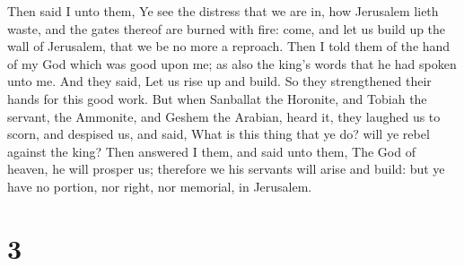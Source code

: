  Then said I unto them, Ye see the distress that we are
in, how Jerusalem lieth waste, and the gates thereof are burned with
fire: come, and let us build up the wall of Jerusalem, that we be no
more a reproach.  Then I told them of the hand of my God
which was good upon me; as also the king's words that he had spoken unto
me. And they said, Let us rise up and build. So they strengthened their
hands for this good work.  But when Sanballat the Horonite,
and Tobiah the servant, the Ammonite, and Geshem the Arabian, heard it,
they laughed us to scorn, and despised us, and said, What is this thing
that ye do? will ye rebel against the king?  Then answered
I them, and said unto them, The God of heaven, he will prosper us;
therefore we his servants will arise and build: but ye have no portion,
nor right, nor memorial, in Jerusalem.

\hypertarget{section-2}{%
\section{3}\label{section-2}}

